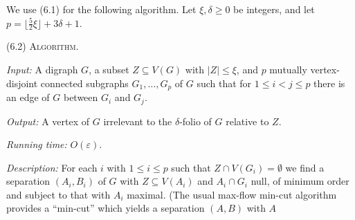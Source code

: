 We use (6.1) for the following algorithm. Let $\xi, \delta \ge 0$ be integers, and let $p = \lfloor \frac{5}{2}\xi \rfloor + 3\delta + 1$.

\stmt
(6.2) \textsc{Algorithm}.

\textit{Input:} A digraph $G$, a subset $Z \subseteq V(G)$ with $|Z| \le \xi$, and $p$ mutually vertex-disjoint connected subgraphs $G_1, \dots, G_p$ of $G$ such that for $1 \le i < j \le p$ there is an edge of $G$ between $G_i$ and $G_j$.

\textit{Output:} A vertex of $G$ irrelevant to the $\delta$-folio of $G$ relative to $Z$.

\textit{Running time:} $O(\varepsilon)$.

\textit{Description:} For each $i$ with $1 \le i \le p$ such that $Z \cap V(G_i) = \emptyset$ we find a separation $(A_i, B_i)$ of $G$ with $Z \subseteq V(A_i)$ and $A_i \cap G_i$ null, of minimum order and subject to that with $A_i$ maximal. (The usual max-flow min-cut algorithm provides a ``min-cut'' which yields a separation $(A, B)$ with $A$
